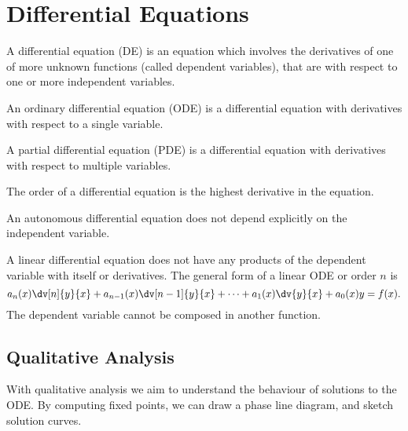 \documentclass{article}
\begin{document}
\section{Differential Equations}
\begin{definition}
    A differential equation (DE) is an equation which involves the derivatives of 
    one of more unknown functions (called dependent variables), that are with respect
    to one or more independent variables.
\end{definition}
\begin{definition}
    An ordinary differential equation (ODE) is a differential equation with 
    derivatives with respect to a single variable.
\end{definition}
\begin{definition}
    A partial differential equation (PDE) is a differential equation with 
    derivatives with respect to multiple variables.
\end{definition}
\begin{definition}
    The order of a differential equation is the highest derivative in the equation.
\end{definition}
\begin{definition}
    An autonomous differential equation does not depend explicitly on the independent variable.
\end{definition}
\begin{definition}
    A linear differential equation does not have any products of the dependent variable with itself
    or derivatives. The general form of a linear ODE or order $n$ is
    \begin{equation*}
        a_n(x)\dv[n]{y}{x} + a_{n-1}(x)\dv[n-1]{y}{x} + \cdots + a_1(x)\dv{y}{x} + a_0(x)y = f(x).
    \end{equation*}
    The dependent variable cannot be composed in another function.
\end{definition}
\subsection{Qualitative Analysis}
With qualitative analysis we aim to understand the behaviour of solutions to the ODE.
By computing fixed points, we can draw a phase line diagram, and sketch solution curves.
\end{document}
